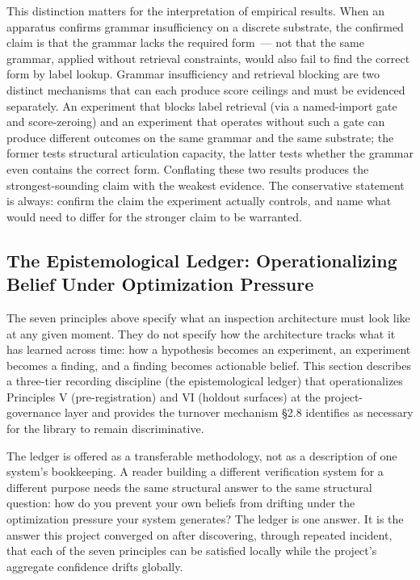 \documentclass[11pt]{article}
\begin{document}
This distinction matters for the interpretation of empirical results. When an apparatus confirms grammar insufficiency on a discrete substrate, the confirmed claim is that the grammar lacks the required form~--- not that the same grammar, applied without retrieval constraints, would also fail to find the correct form by label lookup. Grammar insufficiency and retrieval blocking are two distinct mechanisms that can each produce score ceilings and must be evidenced separately. An experiment that blocks label retrieval (via a named-import gate and score-zeroing) and an experiment that operates without such a gate can produce different outcomes on the same grammar and the same substrate; the former tests structural articulation capacity, the latter tests whether the grammar even contains the correct form. Conflating these two results produces the strongest-sounding claim with the weakest evidence. The conservative statement is always: confirm the claim the experiment actually controls, and name what would need to differ for the stronger claim to be warranted.

\subsection{The Epistemological Ledger: Operationalizing Belief Under Optimization Pressure}

The seven principles above specify what an inspection architecture must look like at any given moment. They do not specify how the architecture tracks what it has learned across time: how a hypothesis becomes an experiment, an experiment becomes a finding, and a finding becomes actionable belief. This section describes a three-tier recording discipline (the epistemological ledger) that operationalizes Principles V (pre-registration) and VI (holdout surfaces) at the project-governance layer and provides the turnover mechanism \S2.8 identifies as necessary for the library to remain discriminative.

The ledger is offered as a transferable methodology, not as a description of one system's bookkeeping. A reader building a different verification system for a different purpose needs the same structural answer to the same structural question: how do you prevent your own beliefs from drifting under the optimization pressure your system generates? The ledger is one answer. It is the answer this project converged on after discovering, through repeated incident, that each of the seven principles can be satisfied locally while the project's aggregate confidence drifts globally.
\end{document}
